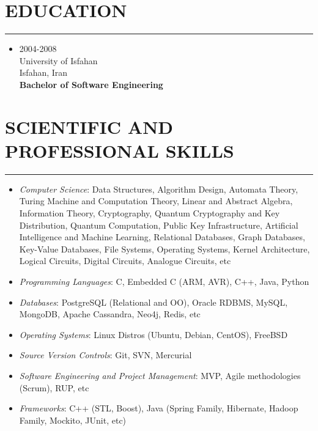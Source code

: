 \documentclass[10pt,a4paper]{article}
\begin{document}

\section{EDUCATION}
\noindent \rule {3.0cm}{0.4pt}
  \begin{itemize}
    \item \small {2004-2008 \\
                  University of Isfahan \\
                  Isfahan, Iran \\
                  \textbf{Bachelor of Software Engineering}}
  \end{itemize}



\section{SCIENTIFIC AND PROFESSIONAL SKILLS}
\noindent \rule {10.0cm}{0.4pt}
\begin{itemize}
  \setlength{\rightskip}{2cm}
  \setlength\itemsep{0em}
  \item \small \textit {Computer Science}:
  Data Structures, Algorithm Design, Automata Theory, Turing Machine and Computation Theory, Linear and Abstract Algebra, Information Theory, Cryptography, Quantum Cryptography and Key Distribution, Quantum Computation, Public Key Infrastructure, Artificial Intelligence and Machine Learning,  Relational Databases, Graph Databases, Key-Value Databases, File Systems, Operating Systems, Kernel Architecture, Logical Circuits, Digital Circuits, Analogue Circuits, etc
  \item \small \textit {Programming Languages}: C, Embedded C (ARM, AVR), C++, Java, Python
  \item \small \textit {Databases}: PostgreSQL (Relational and OO), Oracle RDBMS, MySQL, MongoDB, Apache Cassandra, Neo4j, Redis, etc
  \item \small \textit {Operating Systems}: Linux Distros (Ubuntu, Debian, CentOS), FreeBSD
  \item \small \textit {Source Version Controls}: Git, SVN, Mercurial
  \item \small \textit {Software Engineering and Project Management}: MVP, Agile methodologies (Scrum), RUP, etc
  \item \small \textit {Frameworks}: C++ (STL, Boost), Java (Spring Family, Hibernate, Hadoop Family, Mockito, JUnit, etc)
\end{itemize}
\end{document}
